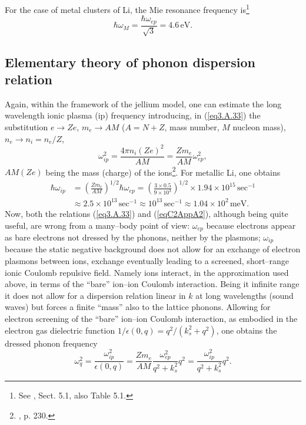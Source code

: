 \begin{subappendices}
For the case of metal clusters of Li, the Mie resonance frequency is\footnote{See \cite{Bertsch:05}, Sect. 5.1, also Table 5.1.}
\begin{equation}
\hbar\omega_M=\frac{\hbar\omega_{ep}}{\sqrt{3}}=4.6\,\text{eV}.
\end{equation}
\subsection{Elementary theory of phonon dispersion relation}\label{App3A3}
Again, within the framework of the jellium model, one can estimate the long wavelength ionic plasma (ip) frequency introducing, in (\ref{eq3.A.33})  the substitution $e\rightarrow Ze$, $m_e\rightarrow AM$ ($A=N+Z$, mass number, $M$ nucleon mass), $n_e\rightarrow n_i=n_e/Z$,
\begin{equation}\label{eqC2AppA2}
\omega_{ip}^2=\frac{4\pi n_i(Ze)^2}{AM}=\frac{Zm_e}{AM}\omega_{ep}^2,
\end{equation}
$AM (Ze)$ being the mass (charge) of the ions\footnote{\cite{Ketterson:99}, p. 230.}.
For metallic Li, one obtains
\begin{align}
\nonumber\hbar\omega_{ip}&=\left(\frac{Zm_e}{AM}\right)^{1/2}\hbar\omega_{ep}=\left(\frac{3\times0.5}{9\times10^3}\right)^{1/2}\times1.94\times 10^{15}\,\text{sec}^{-1}\\
&\approx2.5\times10^{13}\,\text{sec}^{-1}\approx10^{13}\,\text{sec}^{-1}\approx1.04\times10^2\,\text{meV}.
\end{align}
Now, both  the  relations (\ref{eq3.A.33}) and (\ref{eqC2AppA2}), although being quite useful, are wrong from a many--body point of view: $\omega_{ep}$ because electrons appear as bare electrons not dressed by the phonons, neither by the plasmons; $\omega_{ip}$ because the  static negative background does not allow for an exchange of electron plasmons between ions, exchange eventually leading to a screened, short--range ionic Coulomb repulsive field. Namely ions interact, in the approximation used above, in terms of the ``bare'' ion--ion Coulomb interaction. Being it infinite range it does not allow for a dispersion relation linear in $k$ at long wavelengths (sound waves) but forces a finite ``mass'' also to the lattice phonons. Allowing for electron screening of the ``bare'' ion--ion Coulomb interaction, as embodied in the electron gas dielectric function $1/\epsilon(0,q)=q^2/(k_s^2+q^2)$, one obtains the dressed phonon frequency
\begin{equation}\label{eqC2AppA3}
\omega_q^2=\frac{\omega_{ip}^2}{\epsilon(0,q)}=\frac{Zm_e}{AM}\frac{\omega_{ep}^2}{q^2+k_s^2}q^2=\frac{\omega_{ip}^2}{q^2+k_s^2}q^2.

\end{equation}
\end{subappendices}
